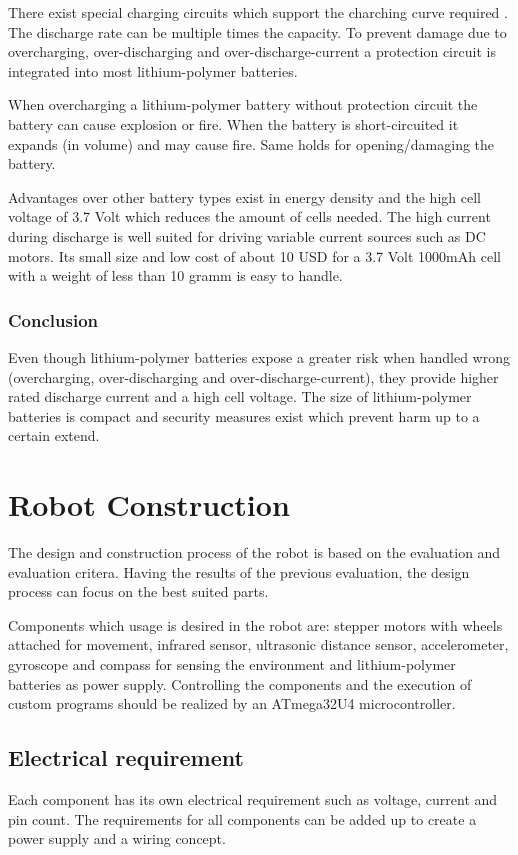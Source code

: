 \documentclass[11pt,a4paper]{article}
\begin{document}
There exist special charging circuits which support the charching curve required . The discharge rate can be multiple times the capacity.
To prevent damage due to overcharging, over-discharging and over-discharge-current a protection circuit is integrated into most lithium-polymer batteries.

When overcharging a lithium-polymer battery without protection circuit the battery can cause explosion or fire. When the battery is short-circuited it expands (in volume) and may cause fire. Same holds for opening/damaging the battery. 

Advantages over other battery types exist in energy density and the high cell voltage of 3.7 Volt which reduces the amount of cells needed. The high current during discharge is well suited for driving variable current sources such as DC motors. Its small size and low cost of about 10 USD for a 3.7 Volt 1000mAh cell with a weight of less than 10 gramm is easy to handle.
\subsubsection{Conclusion}
Even though lithium-polymer batteries expose a greater risk when handled wrong (overcharging, over-discharging and over-discharge-current), they provide higher rated discharge current and a high cell voltage. The size of lithium-polymer batteries is compact and security measures  exist which prevent harm up to a certain extend.
\section{Robot Construction}
The design and construction process of the robot is based on the evaluation and evaluation critera. Having the results of the previous evaluation, the design process can focus on the best suited parts.

Components which usage is desired in the robot are: stepper motors with wheels attached for movement, infrared sensor, ultrasonic distance sensor, accelerometer, gyroscope and compass for sensing the environment and lithium-polymer batteries as power supply. Controlling the components and the execution of custom programs should be realized by an ATmega32U4 microcontroller.

\subsection{Electrical requirement}
Each component has its own electrical requirement such as voltage, current and pin count. The requirements for all components can be added up to create a power supply and a wiring concept. 
\end{document}
